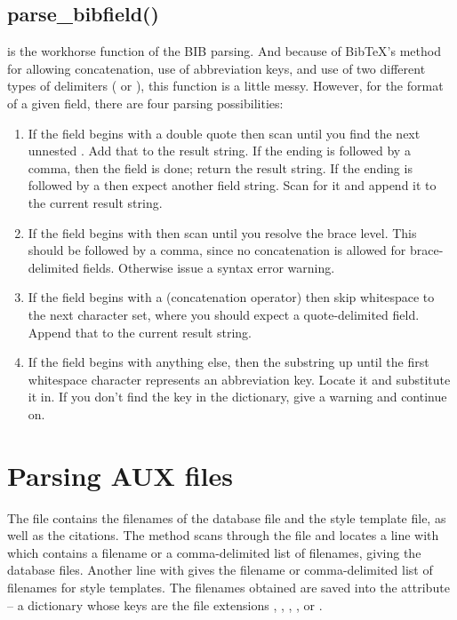 \documentclass[letterpaper,10pt,english]{sphinxmanual}
\begin{document}
\subsection{parse\_bibfield()}
\label{developer_guide:parse-bibfield}
 is the workhorse function of the BIB parsing. And because of BibTeX's method for allowing concatenation, use of abbreviation keys, and use of two different types of delimiters ( or ), this function is a little messy. However, for the format of a given field, there are four parsing possibilities:
\begin{enumerate}
\item {} 
If the field begins with a double quote  then scan until you find the next unnested . Add that to the result string. If the ending  is followed by a comma, then the field is done; return the result string. If the ending is followed by a \code{\#} then expect another field string. Scan for it and append it to the current result string.

\item {} 
If the field begins with \code{\{} then scan until you resolve the brace level. This should be followed by a comma, since no concatenation is allowed for brace-delimited fields. Otherwise issue a syntax error warning.

\item {} 
If the field begins with a \code{\#} (concatenation operator) then skip whitespace to the next character set, where you should expect a quote-delimited field. Append that to the current result string.

\item {} 
If the field begins with anything else, then the substring up until the first whitespace character represents an abbreviation key. Locate it and substitute it in. If you don't find the key in the  dictionary, give a warning and continue on.

\end{enumerate}


\section{Parsing AUX files}
\label{developer_guide:parsing-aux-files}
The  file contains the filenames of the  database file and the  style template file, as well as the citations. The  method scans through the  file and locates a line with  which contains a filename or a comma-delimited list of filenames, giving the database files. Another line with  gives the filename or comma-delimited list of filenames for style templates. The filenames obtained are saved into the  attribute -- a dictionary whose keys are the file extensions , , , , or .
\end{document}

